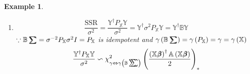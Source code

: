 \documentclass{article}
\newtheorem{example}[theorem]{Example}
\begin{document}
\begin{example}
\begin{enumerate}
\item 
\begin{equation*}
\frac{\text{SSR}}{\sigma ^{2}}=\frac{\mathbb{Y}^{\dagger }P_{\mathbb{X}}%
\mathbb{Y}}{\sigma ^{2}}=\mathbb{Y}^{\dagger }\sigma ^{2}P_{\mathbb{X}}%
\mathbb{Y=Y}^{\dagger }\mathbb{BY}
\end{equation*}%
$\because \mathbb{B}%
\tsum\mkern-20mu\tsum%
=\sigma ^{-2}P_{\mathbb{X}}\sigma ^{2}I=P_{\mathbb{X}}$ is idempotent and $%
\gamma \left( \mathbb{B}%
\tsum\mkern-20mu\tsum%
\right) =\gamma \left( P_{\mathbb{X}}\right) =\gamma =\gamma \left( \mathbb{X%
}\right) $%
\begin{equation*}
\therefore \frac{\mathbb{Y}^{\dagger }P_{\mathbb{X}}\mathbb{Y}}{\sigma ^{2}}%
\backsim \chi _{\gamma \Leftrightarrow \gamma \left( \mathbb{B}%
\tsum\mkern-20mu\tsum%
\right) }^{2}\left( \frac{\left( \mathbb{X}%
\beta\mkern-9.6mu \beta%
\right) ^{\dagger }\mathbb{A}\left( \mathbb{X}%
\beta\mkern-9.6mu \beta%
\right) }{2}\right) _{\ast }
\end{equation*}
\end{enumerate}
\end{example}
\end{document}
